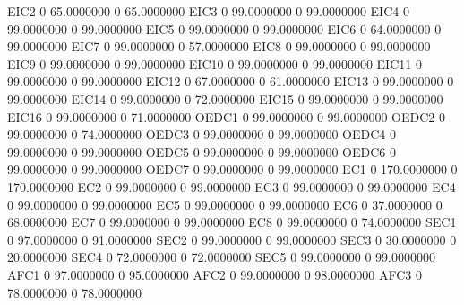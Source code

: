 \documentclass[
  11pt,
  a4paper,
  DIV=12,captions=tableheading,oneside,titlepage]{scrbook}
\let\oldverbatim\verbatim
\let\endoldverbatim\endverbatim
\renewenvironment{verbatim}{\footnotesize\oldverbatim}{\endoldverbatim}
\begin{document}
\begin{verbatim}
  EIC2                   0    65.0000000             0    65.0000000 
  EIC3                   0    99.0000000             0    99.0000000 
  EIC4                   0    99.0000000             0    99.0000000 
  EIC5                   0    99.0000000             0    99.0000000 
  EIC6                   0    64.0000000             0    99.0000000 
  EIC7                   0    99.0000000             0    57.0000000 
  EIC8                   0    99.0000000             0    99.0000000 
  EIC9                   0    99.0000000             0    99.0000000 
  EIC10                  0    99.0000000             0    99.0000000 
  EIC11                  0    99.0000000             0    99.0000000 
  EIC12                  0    67.0000000             0    61.0000000 
  EIC13                  0    99.0000000             0    99.0000000 
  EIC14                  0    99.0000000             0    72.0000000 
  EIC15                  0    99.0000000             0    99.0000000 
  EIC16                  0    99.0000000             0    71.0000000 
  OEDC1                  0    99.0000000             0    99.0000000 
  OEDC2                  0    99.0000000             0    74.0000000 
  OEDC3                  0    99.0000000             0    99.0000000 
  OEDC4                  0    99.0000000             0    99.0000000 
  OEDC5                  0    99.0000000             0    99.0000000 
  OEDC6                  0    99.0000000             0    99.0000000 
  OEDC7                  0    99.0000000             0    99.0000000 
  EC1                    0   170.0000000             0   170.0000000 
  EC2                    0    99.0000000             0    99.0000000 
  EC3                    0    99.0000000             0    99.0000000 
  EC4                    0    99.0000000             0    99.0000000 
  EC5                    0    99.0000000             0    99.0000000 
  EC6                    0    37.0000000             0    68.0000000 
  EC7                    0    99.0000000             0    99.0000000 
  EC8                    0    99.0000000             0    74.0000000 
  SEC1                   0    97.0000000             0    91.0000000 
  SEC2                   0    99.0000000             0    99.0000000 
  SEC3                   0    30.0000000             0    20.0000000 
  SEC4                   0    72.0000000             0    72.0000000 
  SEC5                   0    99.0000000             0    99.0000000 
  AFC1                   0    97.0000000             0    95.0000000 
  AFC2                   0    99.0000000             0    98.0000000 
  AFC3                   0    78.0000000             0    78.0000000 

\end{verbatim}
\end{document}
